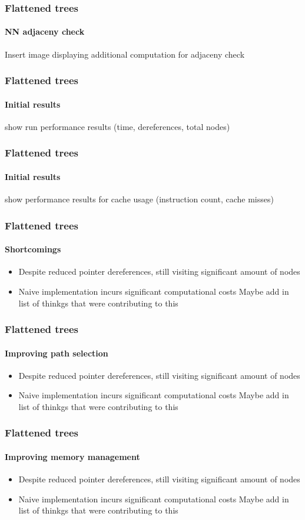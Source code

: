 \begin{frame}
  \frametitle{Flattened \kd trees}
  \framesubtitle{NN adjaceny check}

  Insert image displaying additional computation for adjaceny check

\end{frame}

\begin{frame}
  \frametitle{Flattened \kd trees}
  \framesubtitle{Initial results}

  show run performance results (time, dereferences, total nodes)

\end{frame}

\begin{frame}
  \frametitle{Flattened \kd trees}
  \framesubtitle{Initial results}

  show performance results for cache usage (instruction count, cache misses)

\end{frame}

\begin{frame}
  \frametitle{Flattened \kd trees}
  \framesubtitle{Shortcomings}

  \begin{itemize}
    \item Despite reduced pointer dereferences, still visiting significant amount of nodes
    \item Naive implementation incurs significant computational costs 
       Maybe add in list of thinkgs that were contributing to this
  \end{itemize}

\end{frame}

\begin{frame}
  \frametitle{Flattened \kd trees}
  \framesubtitle{Improving path selection}

  \begin{itemize}
    \item Despite reduced pointer dereferences, still visiting significant amount of nodes
    \item Naive implementation incurs significant computational costs 
       Maybe add in list of thinkgs that were contributing to this
  \end{itemize}

\end{frame}

\begin{frame}
  \frametitle{Flattened \kd trees}
  \framesubtitle{Improving memory management}

  \begin{itemize}
    \item Despite reduced pointer dereferences, still visiting significant amount of nodes
    \item Naive implementation incurs significant computational costs 
       Maybe add in list of thinkgs that were contributing to this
  \end{itemize}

\end{frame}
